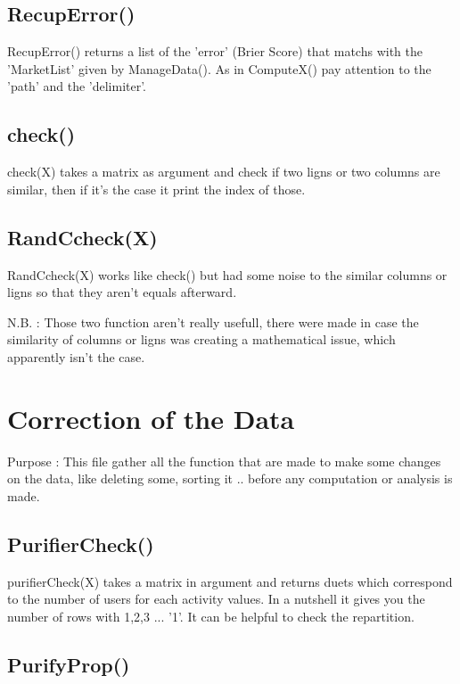 \documentclass{report}
\begin{document}
\subsection{RecupError()}

RecupError() returns a list of the 'error' (Brier Score) that matchs with the 'MarketList' given by ManageData(). As in ComputeX() pay attention to the 'path' and the 'delimiter'. 

\subsection{check()}

check(X) takes a matrix as argument and check if two ligns or two columns are similar, then if it's the case it print the index of those.

\subsection{RandCcheck(X)}

RandCcheck(X) works like check() but had some noise to the similar columns or ligns so that they aren't equals afterward.

N.B. : Those two function aren't really usefull, there were made in case the similarity of columns or ligns was creating a mathematical issue, which apparently isn't the case.

\section{Correction of the Data}

Purpose : This file gather all the function that are made to make some changes on the data, like deleting some, sorting it .. before any computation or analysis is made.

\subsection{PurifierCheck()}

purifierCheck(X) takes a matrix in argument and returns duets which correspond to the number of users for each activity values. In a nutshell it gives you the number of rows with 1,2,3 ... '1'.  
It can be helpful to check the repartition. 

\subsection{PurifyProp()} 
\end{document}
